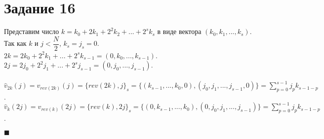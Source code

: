 \documentclass{article}
\newcommand\proofend{\begin{flushright}$\blacksquare$\end{flushright}}
\begin{document}
{	\section*{Задание 16}
	Представим число $k = k_0 + 2k_1 + 2^2k_2 + ... + 2^sk_s$ в виде вектора $(k_0, k_1, ..., k_s)$.\\
	Так как $k$ и $j < \dfrac{N}{2}$, $k_s = j_s = 0$.\\
	$2k = 2k_0 + 2^2k_1 + ... + 2^sk_{s-1} = (0, k_0, ..., k_{s-1})$.\\
	$2j = 2j_0 + 2^2j_1 + ... + 2^sj_{s-1} = (0, j_0, ..., j_{s-1})$.\\ \\
	$\hat v_{2k}(j) = v_{rev(2k)}(j) = \{rev(2k), j\}_s = \{(k_{s-1}, ..., k_0, 0), (j_0, j_1, ..., j_{s-1}, 0)\} = \sum\limits_{p = 0}^{s-1}j_pk_{s-1-p}$.\\
	$\hat v_{k}(2j) = v_{rev(k)}(2j) = \{rev(k), 2j\}_s = \{(0,k_{s-1}, ..., k_0), (0, j_0, j_1, ..., j_{s-1})\} = \sum\limits_{p = 0}^{s-1}j_pk_{s-1-p}$.\\
	\proofend
	\pagebreak

}
\end{document}
